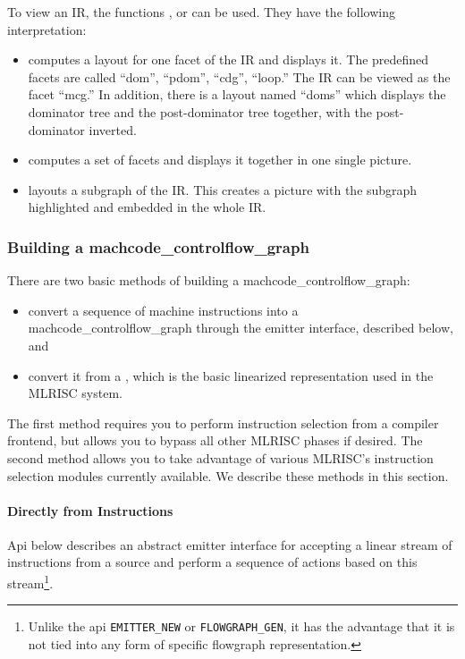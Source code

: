 To view an IR, the functions ,  or
 can be used.  They have the following interpretation:
\begin{itemize}
\item {} computes a layout for one facet of the IR and displays
it.  The predefined facets are called
``dom'', ``pdom'', ``cdg'', ``loop.''  The IR can be
viewed as the facet ``mcg.'' In addition, there is a layout
named ``doms'' which displays the dominator tree and the post-dominator
tree together, with the post-dominator inverted.
\item {} computes a set of facets and displays it together
in one single picture.
\item {} layouts a subgraph of the IR.
This creates a picture with the subgraph highlighted and embedded
in the whole IR.
\end{itemize}

\subsubsection{Building a machcode_controlflow_graph}

There are two basic methods of building a machcode_controlflow_graph:
\begin{itemize}
\item convert a sequence of machine instructions
into a machcode_controlflow_graph through the emitter interface, described below, and 
\item convert it from a , which is
the basic linearized representation used in the MLRISC system.
\end{itemize}
The first method requires you to perform instruction selection
from a compiler frontend, but allows you to bypass all other
MLRISC phases if desired.  The second method allows you
to take advantage of various MLRISC's instruction selection modules
currently available.  We describe these methods in this section.

\paragraph{Directly from Instructions}
 Api  below describes an abstract emitter interface
for accepting a linear stream of instructions from a source 
and perform a sequence of actions based on this
stream\footnote{Unlike the api {\tt EMITTER\_NEW} or 
{\tt FLOWGRAPH\_GEN}, it has the advantage that it is not 
tied into any form of specific flowgraph representation.}.  


